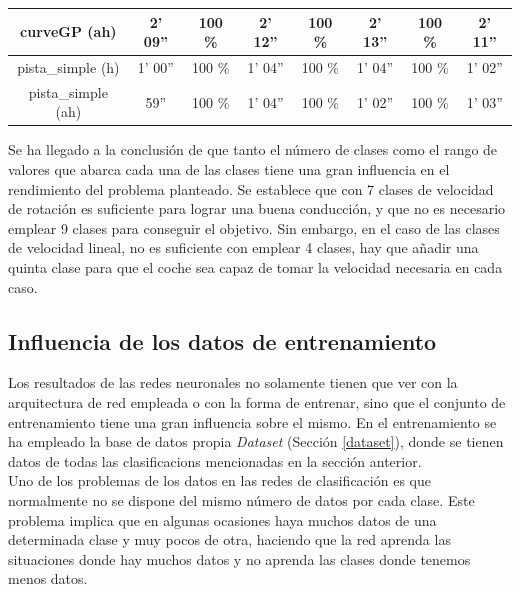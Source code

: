\begin{table}[H]
\begin{tabular}{c|c|c|c|c|c|c|c|}
\multicolumn{1}{|c|}{curveGP (ah)}       & 2' 09''            & 100 \%         & 2' 12''            & 100 \%        & 2' 13''          & 100 \%      & 2' 11''     \\ \hline
\multicolumn{1}{|c|}{pista\_simple (h)}       & 1' 00''           & 100 \%          & 1' 04''            & 100 \%        & 1' 04''             & 100 \%      & 1' 02''       \\ \hline
\multicolumn{1}{|c|}{pista\_simple (ah)}     & 59''            & 100 \%          & 1' 04''          & 100 \%        & 1' 02''             & 100 \%      & 1' 03''        \\ \hline
\end{tabular}
\end{table}



Se ha llegado a la conclusión de que tanto el número de clases como el rango de valores que abarca cada una de las clases tiene una gran influencia en el rendimiento del problema planteado. Se establece que con 7 clases de velocidad de rotación es suficiente para lograr una buena conducción, y que no es necesario emplear 9 clases para conseguir el objetivo. Sin embargo, en el caso de las clases de velocidad lineal, no es suficiente con emplear 4 clases, hay que añadir una quinta clase para que el coche sea capaz de tomar la velocidad necesaria en cada caso.\\



\subsection{Influencia de los datos de entrenamiento}

Los resultados de las redes neuronales no solamente tienen que ver con la arquitectura de red empleada o con la forma de entrenar, sino que el conjunto de entrenamiento tiene una gran influencia sobre el mismo. En el entrenamiento se ha empleado la base de datos propia \textit{Dataset} (Sección \ref{dataset}), donde se tienen datos de todas las clasificacions mencionadas en la sección anterior. \\

Uno de los problemas de los datos en las redes de clasificación es que normalmente no se dispone del mismo número de datos por cada clase. Este problema implica que en algunas ocasiones haya muchos datos de una determinada clase y muy pocos de otra, haciendo que la red aprenda las situaciones donde hay muchos datos y no aprenda las clases donde tenemos menos datos.\\

